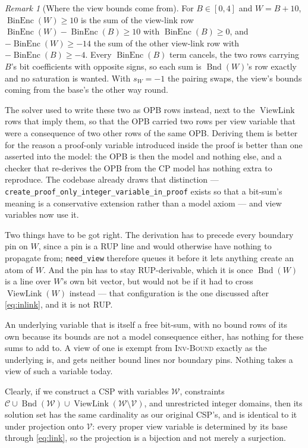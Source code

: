 \documentclass[11pt,a4paper]{article}
\theoremstyle{plain}
\theoremstyle{definition}
\theoremstyle{remark}
\newtheorem{remarkN}{Remark}
\newcommand{\fname}[1]{\ensuremath{\operatorname{#1}}}
\newcommand{\BinEnc}{\fname{BinEnc}}
\newcommand{\Bnd}{\fname{Bnd}}
\newcommand{\ViewLink}{\fname{ViewLink}}
\newcommand{\inv}[1]{\textnormal{\textsc{Inv-#1}}}
\newcommand{\code}[1]{\texttt{#1}}
\begin{document}
\begin{remarkN}[Where the view bounds come from]
\label{rem:derivedbounds}
For $B\in[0,4]$ and $W=B+10$, $\BinEnc(W)\geq 10$ is the sum of the view-link
row $\BinEnc(W)-\BinEnc(B)\geq 10$ with $\BinEnc(B)\geq 0$, and
$-\BinEnc(W)\geq -14$ the sum of the other view-link row with
$-\BinEnc(B)\geq -4$.  Every $\BinEnc(B)$ term cancels, the two rows carrying
$B$'s bit coefficients with opposite signs, so each sum is $\Bnd(W)$'s row
exactly and no saturation is wanted.  With $s_W=-1$ the pairing swaps, the
view's bounds coming from the base's the other way round.

The solver used to write these two as OPB rows instead, next to the
\ViewLink{} rows that imply them, so that the OPB carried two rows per view
variable that were a consequence of two other rows of the same OPB.  Deriving
them is better for the reason a proof-only variable introduced inside the proof
is better than one asserted into the model: the OPB is then the model and
nothing else, and a checker that re-derives the OPB from the CP model has
nothing extra to reproduce.  The codebase already draws that distinction ---
\code{create\_proof\_only\_integer\_variable\_in\_proof} exists so that a
bit-sum's meaning is a conservative extension rather than a model axiom --- and
view variables now use it.

Two things have to be got right.  The derivation has to precede every boundary
pin on $W$, since a pin is a RUP line and would otherwise have nothing to
propagate from; \code{need\_view} therefore queues it before it lets anything
create an atom of $W$.  And the pin has to stay RUP-derivable, which it is once
$\Bnd(W)$ is a line over $W$'s own bit vector, but would not be if it had to
cross $\ViewLink(W)$ instead --- that configuration is the one discussed after
\cref{eq:inlink}, and it is not RUP.

An underlying variable that is itself a free bit-sum, with no bound rows of its
own because its bounds are not a model consequence either, has nothing for these
sums to add to.  A view of one is exempt from \inv{Bound} exactly as the
underlying is, and gets neither bound lines nor boundary pins.  Nothing takes a
view of such a variable today.
\end{remarkN}

Clearly, if we construct a CSP with variables $\mathcal W$, constraints
$\mathcal C \cup \Bnd(\mathcal W)\cup\ViewLink(\mathcal W\setminus\mathcal V)$, and unrestricted
integer domains, then its solution set has the same cardinality as our original
CSP's, and is identical to it under projection onto $\mathcal V$: every proper
view variable is determined by its base through \cref{eq:link}, so the
projection is a bijection and not merely a surjection.
\end{document}
